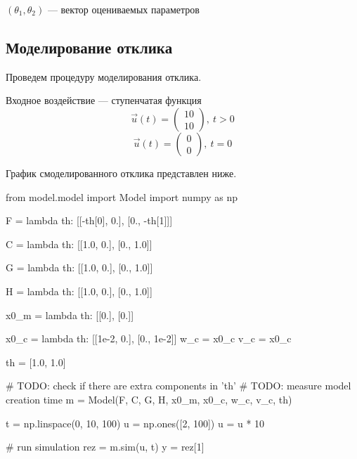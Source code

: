 \documentclass[a4paper,14pt]{extarticle}
\begin{document}
$(\theta_1, \theta_2)$ --- вектор оцениваемых параметров

\subsection{Моделирование отклика}

Проведем процедуру моделирования отклика. 

Входное воздействие --- ступенчатая функция
\[
	\vec{u}(t) = \begin{pmatrix} 10 \\ 10 \end{pmatrix},\ t > 0
\]
\[
	\vec{u}(t) = \begin{pmatrix} 0 \\ 0 \end{pmatrix},\ t = 0
\]

График смоделированного отклика представлен ниже.

\renewcommand{\baselinestretch}{1}
\begin{pycode}
from model.model import Model
import numpy as np

F = lambda th: [[-th[0], 0.],
                [0., -th[1]]]

C = lambda th: [[1.0, 0.],
                [0., 1.0]]

G = lambda th: [[1.0, 0.],
                [0., 1.0]]

H = lambda th: [[1.0, 0.],
                [0., 1.0]]

x0_m = lambda th: [[0.],
                   [0.]]

x0_c = lambda th: [[1e-2, 0.],
                   [0., 1e-2]]
w_c = x0_c
v_c = x0_c

th = [1.0, 1.0]

# TODO: check if there are extra components in 'th'
# TODO: measure model creation time
m = Model(F, C, G, H, x0_m, x0_c, w_c, v_c, th)

t = np.linspace(0, 10, 100)
u = np.ones([2, 100])
u = u * 10

# run simulation
rez = m.sim(u, t)
y = rez[1]
\end{pycode}
\end{document}
